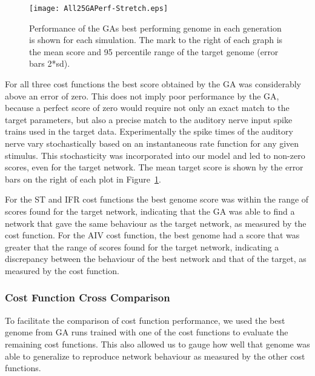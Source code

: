 \begin{figure}[t!]
  \centering
  \texttt{[image: All25GAPerf-Stretch.eps]}
  \caption{Performance of the GAs best performing genome in each
    generation is shown for each simulation. The mark to the right of
    each graph is the mean score and 95 percentile range of the target
    genome (error bars 2*sd).}\label{fig:GA:R1}
\end{figure}

\smallskip{}

For all three cost functions the best score obtained by the GA was considerably
above an error of zero. This does not imply poor performance by the GA, because
a perfect score of zero would require not only an exact match to the target
parameters, but also a precise match to the auditory nerve input spike trains
used in the target data. Experimentally the spike times of the auditory nerve
vary stochastically based on an instantaneous rate function for any given
stimulus. This stochasticity was incorporated into our model and led to non-zero
scores, even for the target network. The mean target score is shown by the error
bars on the right of each plot in Figure~\ref{fig:GA:R1}.

\smallskip{}

For the ST and IFR cost functions the best genome score was within the range of
scores found for the target network, indicating that the GA was able to find a
network that gave the same behaviour as the target network, as measured by the
cost function. For the AIV cost function, the best genome had a score that was
greater that the range of scores found for the target network, indicating a
discrepancy between the behaviour of the best network and that of the target, as
measured by the cost function.




\subsubsection{Cost Function Cross Comparison}

To facilitate the comparison of cost function performance, we used the best
genome from GA runs trained with one of the cost functions to evaluate the
remaining cost functions. This also allowed us to gauge how well that genome was
able to generalize to reproduce network behaviour as measured by the other cost
functions.


